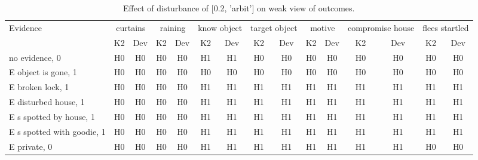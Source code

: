 \begin{table}\begin{tabular}{l|cc|cc|cc|cc|cc|cc|cc}\toprule\multirow{2}{*}{Evidence} & \multicolumn{2}{c}{curtains}& \multicolumn{2}{c}{raining}& \multicolumn{2}{c}{know object}& \multicolumn{2}{c}{target object}& \multicolumn{2}{c}{motive}& \multicolumn{2}{c}{compromise house}& \multicolumn{2}{c}{flees startled}\\& {K2} & {Dev}& {K2} & {Dev}& {K2} & {Dev}& {K2} & {Dev}& {K2} & {Dev}& {K2} & {Dev}& {K2} & {Dev}\\\midrule
no evidence, 0 & H0&H0&H0&H0&H1&H1&H0&H0&H0&H0&H0&H0&H0&H0\\E object is gone, 1 & H0&H0&H0&H0&H0&H0&H0&H0&H0&H0&H0&H0&H0&H0\\E broken lock, 1 & H0&H0&H0&H0&H1&H1&H1&H1&H1&H1&H1&H1&H1&H1\\E disturbed house, 1 & H0&H0&H0&H0&H1&H1&H1&H1&H1&H1&H1&H1&H1&H1\\E s spotted by house, 1 & H0&H0&H0&H0&H1&H1&H1&H1&H1&H1&H1&H1&H1&H1\\E s spotted with goodie, 1 & H0&H0&H0&H0&H1&H1&H1&H1&H1&H1&H1&H1&H1&H1\\E private, 0 & H0&H0&H0&H0&H1&H1&H1&H1&H1&H1&H1&H1&H0&H0\\\bottomrule\end{tabular}\caption{Effect of disturbance of [0.2, 'arbit'] on weak view of outcomes.}\end{table}